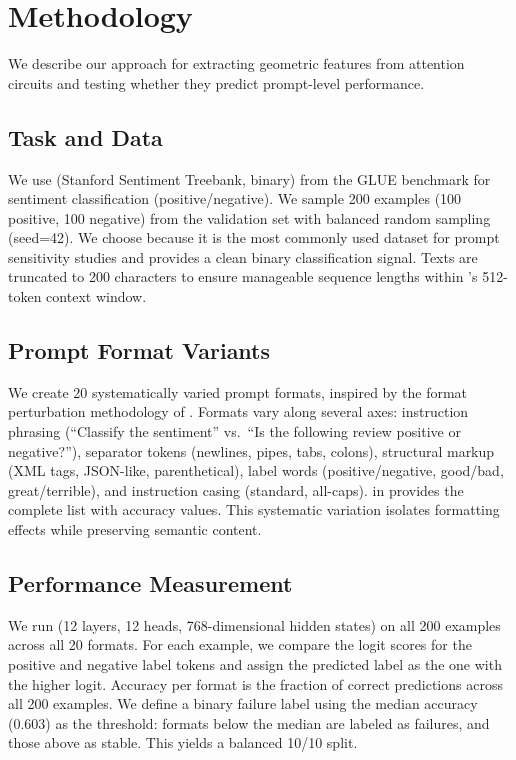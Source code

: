 \section{Methodology}
\label{sec:method}

We describe our approach for extracting geometric features from attention circuits and testing whether they predict prompt-level performance.

\subsection{Task and Data}
\label{sec:data}

We use \ssttwo (Stanford Sentiment Treebank, binary) from the GLUE benchmark for sentiment classification (positive/negative).
We sample 200 examples (100 positive, 100 negative) from the validation set with balanced random sampling (seed=42).
We choose \ssttwo because it is the most commonly used dataset for prompt sensitivity studies \citep{sclar2023quantifying, mizrahi2024state} and provides a clean binary classification signal.
Texts are truncated to 200 characters to ensure manageable sequence lengths within \gptsmall's 512-token context window.

\subsection{Prompt Format Variants}
\label{sec:prompts}

We create 20 systematically varied prompt formats, inspired by the format perturbation methodology of \citet{sclar2023quantifying}.
Formats vary along several axes: instruction phrasing (\eg ``Classify the sentiment'' vs.\ ``Is the following review positive or negative?''), separator tokens (newlines, pipes, tabs, colons), structural markup (XML tags, JSON-like, parenthetical), label words (positive/negative, good/bad, great/terrible), and instruction casing (standard, all-caps).
 in  provides the complete list with accuracy values.
This systematic variation isolates formatting effects while preserving semantic content.

\subsection{Performance Measurement}
\label{sec:performance}

We run \gptsmall (12 layers, 12 heads, 768-dimensional hidden states) on all 200 examples across all 20 formats.
For each example, we compare the logit scores for the positive and negative label tokens and assign the predicted label as the one with the higher logit.
Accuracy per format is the fraction of correct predictions across all 200 examples.
We define a binary failure label using the median accuracy (0.603) as the threshold: formats below the median are labeled as failures, and those above as stable.
This yields a balanced 10/10 split.

